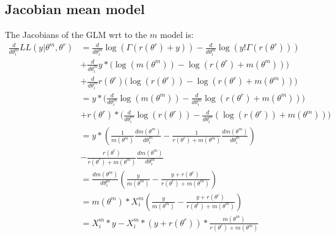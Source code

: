 \documentclass[bibliography=totoc,10pt]{scrartcl}
\begin{document}
\subsection{Jacobian mean model}
The Jacobians of the GLM wrt to the $m$ model is:
\begin{equation}
\begin{split}
\frac{d}{d \theta^m_i} LL(y|\theta^m, \theta^r) &= \frac{d}{d \theta^m_i} \log(\Gamma(r(\theta^r)+y)) - \frac{d}{d \theta^m_i} \log(y! \Gamma(r(\theta^r))) \\
&+ \frac{d}{d \theta^m_i} y* \bigg( \log(m(\theta^m)) -\log(r(\theta^r)+m(\theta^m)) \bigg) \\
&+ \frac{d}{d \theta^m_i} r(\theta^r) \bigg( \log(r(\theta^r)) -\log(r(\theta^r)+m(\theta^m)) \bigg) \\
&= y* \bigg( \frac{d}{d \theta^m_i} \log(m(\theta^m)) - \frac{d}{d \theta^m_i}\log(r(\theta^r)+m(\theta^m)) \bigg) \\
&+ r(\theta^r) * \bigg( \frac{d}{d \theta^m_i}\log(r(\theta^r)) - \frac{d}{d \theta^m_i} (\log(r(\theta^r))+m(\theta^m)) \bigg) \\
&= y*(\frac{1}{m(\theta^m)}  \frac{d m(\theta^m)}{d \theta^m_i} - \frac{1}{r(\theta^r)+m(\theta^m)}  \frac{d m(\theta^m)}{d \theta^m_i}) \\
&- \frac{r(\theta^r)}{r(\theta^r)+m(\theta^m)}  \frac{d m(\theta^m)}{d \theta^m_i} \\
&=  \frac{d m(\theta^m)}{d \theta^m_i} (\frac{y}{m(\theta^m)} - \frac{y+r(\theta^r)}{r(\theta^r)+m(\theta^m)}) \\
&=  m(\theta^m) * X^m_{i}  (\frac{y}{m(\theta^m)} - \frac{y+r(\theta^r)}{r(\theta^r)+m(\theta^m)}) \\
&=  X^m_{i}*y - X^m_{i}*(y+r(\theta^r))*\frac{m(\theta^m)}{r(\theta^r)+m(\theta^m)} \\
\end{split}
\end{equation}
\end{document}

